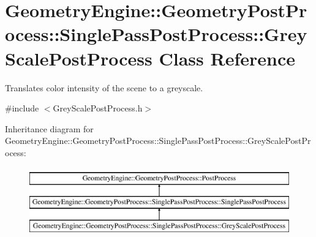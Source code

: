 \hypertarget{class_geometry_engine_1_1_geometry_post_process_1_1_single_pass_post_process_1_1_grey_scale_post_process}{}\section{Geometry\+Engine\+::Geometry\+Post\+Process\+::Single\+Pass\+Post\+Process\+::Grey\+Scale\+Post\+Process Class Reference}
\label{class_geometry_engine_1_1_geometry_post_process_1_1_single_pass_post_process_1_1_grey_scale_post_process}


Translates color intensity of the scene to a greyscale.  




{\ttfamily \#include $<$Grey\+Scale\+Post\+Process.\+h$>$}

Inheritance diagram for Geometry\+Engine\+::Geometry\+Post\+Process\+::Single\+Pass\+Post\+Process\+::Grey\+Scale\+Post\+Process\+:\begin{figure}[H]
\begin{center}
\leavevmode
\includegraphics[height=3.000000cm]{class_geometry_engine_1_1_geometry_post_process_1_1_single_pass_post_process_1_1_grey_scale_post_process}
\end{center}
\end{figure}

